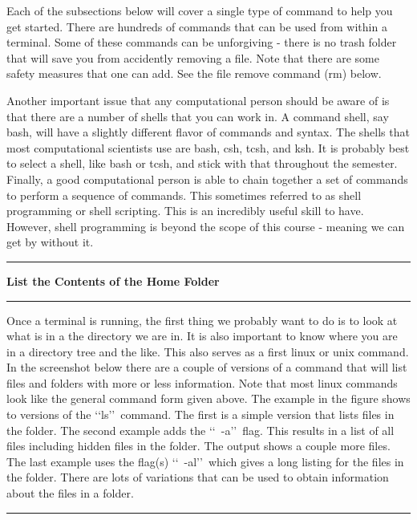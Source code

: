 \documentclass[10pt,fleqn]{article}
\begin{document}
Each of the subsections below will cover a single type of command to help you
get started. There are hundreds of commands that can be used from within a
terminal. Some of these commands can be unforgiving - there is no trash folder
that will save you from accidently removing a file. Note that there are some
safety measures that one can add. See the file remove command (rm) below.

Another important issue that any computational person should be aware of is that
there are a number of shells that you can work in. A command shell, say bash,
will have a slightly different flavor of commands and syntax. The shells that
most computational scientists use are bash, csh, tcsh, and ksh. It is probably
best to select a shell, like bash or tcsh, and stick with that throughout the
semester. Finally, a good computational person is able to chain together a set
of commands to perform a sequence of commands. This sometimes referred to as
shell programming or shell scripting. This is an incredibly useful skill to
have. However, shell programming is beyond the scope of this course - meaning we
can get by without it.
\vskip0.1in\hrule\vskip0.1in
\noindent
{\large{\bf List the Contents of the Home Folder} }
\vskip0.1in\hrule\vskip0.1in
\noindent
Once a terminal is running, the first thing we probably want to do is to look at
what is in a the directory we are in. It is also important to know where you are
in a directory tree and the like. This also serves as a first linux or unix
command. In the screenshot below there are a couple of versions of a command
that will list files and folders with more or less information. Note that most
linux commands look like the general command form given above. The example in
the figure shows to versions of the \lq\lq ls\rq\rq\ command. The first is a
simple version that lists files in the folder. The second example adds the
\lq\lq\ -a\rq\rq\ flag. This results in a list of all files including hidden
files in the folder. The output shows a couple more files. The last example
uses the flag(s) \lq\lq\ -al\rq\rq\ which gives a long listing for the files in
the folder. There are lots of variations that can be used to obtain information
about the files in a folder.
\vskip0.1in\hrule\vskip0.1in
\vfill
\end{document}
